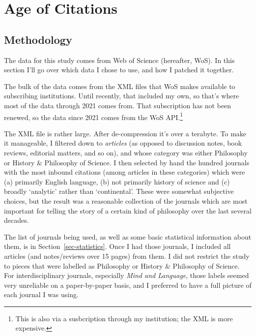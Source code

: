 \documentclass[
]{ergoclass}
\begin{document}
\section{Age of Citations}\label{sec-age-of-citations}

\subsection{Methodology}\label{sec-methodology}

The data for this study comes from Web of Science (hereafter, WoS). In
this section I'll go over which data I chose to use, and how I patched
it together.

The bulk of the data comes from the XML files that WoS makes available
to subscribing institutions. Until recently, that included my own, so
that's where most of the data through 2021 comes from. That subscription
has not been renewed, so the data since 2021 comes from the WoS
API.\footnote{This is also via a susbcription through my institution;
  the XML is more expensive.}

The XML file is rather large. After de-compression it's over a terabyte.
To make it manageable, I filtered down to \emph{articles} (as opposed to
discussion notes, book reviews, editorial matters, and so on), and whose
category was either Philosophy or History \& Philosophy of Science. I
then selected by hand the hundred journals with the most inbound
citations (among articles in these categories) which were (a) primarily
English language, (b) not primarily history of science and (c) broadly
`analytic' rather than `continental'. These were somewhat subjective
choices, but the result was a reasonable collection of the journals
which are most important for telling the story of a certain kind of
philosophy over the last several decades.

The list of journals being used, as well as some basic statistical
information about them, is in Section~\ref{sec-statistics}. Once I had
those journals, I included all articles (and notes/reviews over 15
pages) from them. I did not restrict the study to pieces that were
labelled as Philosophy or History \& Philosophy of Science. For
interdisciplinary journals, especially \emph{Mind and Language}, those
labels seemed very unreliable on a paper-by-paper basis, and I preferred
to have a full picture of each journal I was using.
\end{document}
